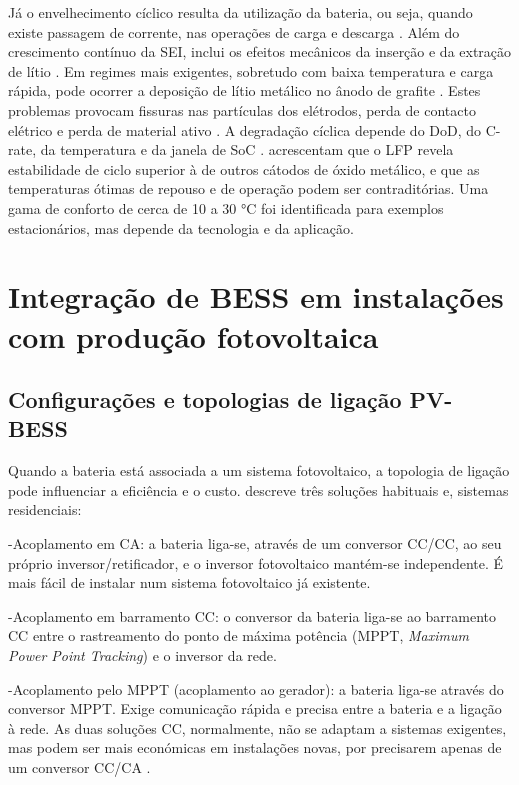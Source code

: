 Já o envelhecimento cíclico resulta da utilização da bateria, ou seja, quando existe passagem de corrente, nas operações de carga e descarga \cite{ Raj2020}. Além do crescimento contínuo da SEI, inclui os efeitos mecânicos da inserção e da extração de lítio \cite{Arif2026}. Em regimes mais exigentes, sobretudo com baixa temperatura e carga rápida, pode ocorrer a deposição de lítio metálico no ânodo de grafite \cite{ Hesse2017}. Estes problemas provocam fissuras nas partículas dos elétrodos, perda de contacto elétrico e perda de material ativo \cite{Madabattula2026}. A degradação cíclica depende do DoD, do C-rate, da temperatura e da janela de SoC \cite{ Raj2020}\cite{Madabattula2026}. \textcite{ Hesse2017} acrescentam que o LFP revela estabilidade de ciclo superior à de outros cátodos de óxido metálico, e que as temperaturas ótimas de repouso e de operação podem ser contraditórias. Uma gama de conforto de cerca de 10 a 30 °C foi identificada para exemplos estacionários, mas depende da tecnologia e da aplicação.

\section{Integração de BESS em instalações com produção fotovoltaica}
\label{sec:Ch2.2}

\subsection{Configurações e topologias de ligação PV-BESS}
\label{sec:Ch2.2.1}

Quando a bateria está associada a um sistema fotovoltaico, a topologia de ligação pode influenciar a eficiência e o custo. \textcite{ Hesse2017} descreve três soluções habituais e, sistemas residenciais: 

-Acoplamento em CA: a bateria liga-se, através de um conversor CC/CC, ao seu próprio inversor/retificador, e o inversor fotovoltaico mantém-se independente. É mais fácil de instalar num sistema fotovoltaico já existente. 

-Acoplamento em barramento CC: o conversor da bateria liga-se ao barramento CC entre o rastreamento do ponto de máxima potência (MPPT, \textit{Maximum Power Point Tracking}) e o inversor da rede. 

-Acoplamento pelo MPPT (acoplamento ao gerador): a bateria liga-se através do conversor MPPT. Exige comunicação rápida e precisa entre a bateria e a ligação à rede.
As duas soluções CC, normalmente, não se adaptam a sistemas exigentes, mas podem ser mais económicas em instalações novas, por precisarem apenas de um conversor CC/CA \cite{ Hesse2017}.

